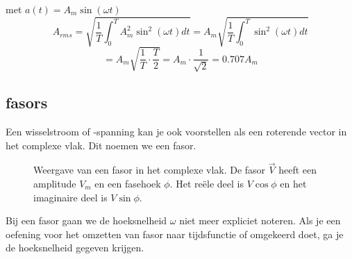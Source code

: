 \documentclass[a4paper,11pt]{article}
\begin{document}

met $a(t) = A_m \sin(\omega t)$
\[A_{rms} = \sqrt{\frac{1}{T} \int_0^T A_m^2 \sin^2(\omega t) dt} = A_m \sqrt{\frac{1}{T} \int_0^T \sin^2(\omega t) dt}
\]
\[= A_m \sqrt{\frac{1}{T} \cdot \frac{T}{2}} = A_m \cdot \frac{1}{\sqrt{2}} = 0.707 A_m\]

\vspace{0.3cm}

\subsection{fasors}

Een wisselstroom of -spanning kan je ook voorstellen als een roterende vector in het complexe vlak.
Dit noemen we een fasor.

\vspace{0.5cm}

\begin{figure}[H]
\centering
{}
\caption{Weergave van een fasor in het complexe vlak. De fasor $\vec{V}$ heeft een amplitude $V_m$ en een fasehoek $\phi$. Het reële deel is $V \cos\phi$ en het imaginaire deel is $V \sin\phi$.}
\label{fig:fasor}
\end{figure}

Bij een fasor gaan we de hoeksnelheid $\omega$ niet meer expliciet noteren.
Als je een oefening voor het omzetten van fasor naar tijdsfunctie of omgekeerd doet,
ga je de hoeksnelheid gegeven krijgen.
\end{document}
